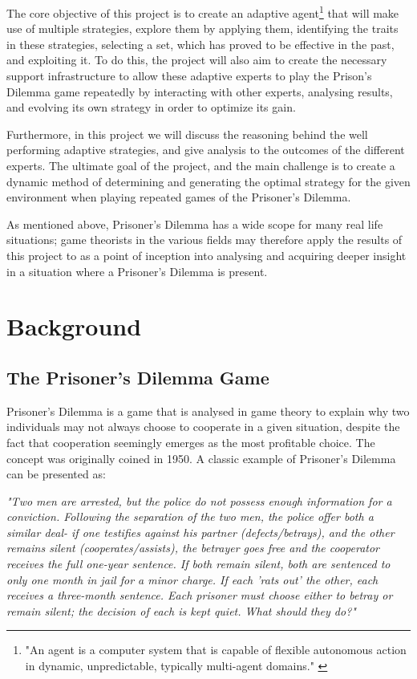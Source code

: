 \documentclass{icldt}
\numberwithin{equation}{section}       %
\begin{document}
The core objective of this project is to create an adaptive agent\footnote{ "An agent is a computer system that is capable of flexible autonomous action in dynamic, unpredictable, typically multi-agent domains." \cite{agent2005}} that will make use of multiple strategies, explore them by applying them, identifying the traits in these strategies, selecting a set, which has proved to be effective in the past, and exploiting it. To do this, the project will also aim to create the necessary support infrastructure to allow these adaptive experts to play the Prison's Dilemma game repeatedly by interacting with other experts, analysing results, and evolving its own strategy in order to optimize its gain.

Furthermore, in this project we will discuss the reasoning behind the well performing adaptive strategies, and give analysis to the outcomes of the different experts. The ultimate goal of the project, and the main challenge is to create a dynamic method of determining and generating the optimal strategy for the given environment when playing repeated games of the Prisoner's Dilemma. 

As mentioned above, Prisoner's Dilemma has a wide scope for many real life situations; game theorists in the various fields may therefore apply the results of this project to as a point of inception into analysing and acquiring deeper insight in a situation where a Prisoner's Dilemma is present.

\chapter{Background}
\label{ch:background}
\section{The Prisoner's Dilemma Game}
\label{sect:The Prisoner\'s Dilemma Game}
Prisoner's Dilemma is a game that is analysed in game theory to explain why two individuals may not always choose to cooperate in a given situation, despite the fact that cooperation seemingly emerges as the most profitable choice. The concept was originally coined in 1950. A classic example of Prisoner's Dilemma can be presented as:
\\
\begin{center}
\parbox[c]{12cm}{\emph{"Two men are arrested, but the police do not possess enough information for a conviction. Following the separation of the two men, the police offer both a similar deal- if one testifies against his partner (defects/betrays), and the other remains silent (cooperates/assists), the betrayer goes free and the cooperator receives the full one-year sentence. If both remain silent, both are sentenced to only one month in jail for a minor charge. If each 'rats out' the other, each receives a three-month sentence. Each prisoner must choose either to betray or remain silent; the decision of each is kept quiet. What should they do?"\\}}
\end{center}
\end{document}
